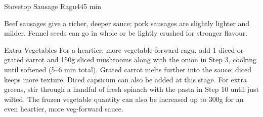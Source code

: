 \begin{recipebox}{Stovetop Sausage Ragu}{4}{45 min}
\begin{notes}
Beef sausages give a richer, deeper sauce; pork sausages are slightly lighter and milder. Fennel seeds can go in whole or be lightly crushed for stronger flavour.
\end{notes}

\begin{variationbox}{Extra Vegetables}
For a heartier, more vegetable-forward ragu, add 1 diced or grated carrot and 150g sliced mushrooms along with the onion in Step 3, cooking until softened (5--6 min total). Grated carrot melts further into the sauce; diced keeps more texture. Diced capsicum can also be added at this stage. For extra greens, stir through a handful of fresh spinach with the pasta in Step 10 until just wilted. The frozen vegetable quantity can also be increased up to 300g for an even heartier, more veg-forward sauce.
\end{variationbox}

\end{recipebox}